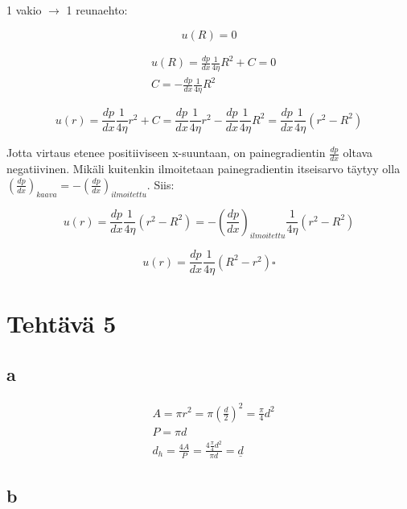\documentclass[12pt,a4paper,finnish]{article}
\begin{document}
1 vakio $\rightarrow$ 1 reunaehto:

\begin{equation}
 u(R) = 0
\end{equation}

\begin{align}
 &u(R) = \frac{dp}{dx}\frac{1}{4\eta}R^2 + C = 0\\
 &C = -\frac{dp}{dx}\frac{1}{4\eta}R^2
\end{align}

\begin{equation}
 u(r) = \frac{dp}{dx}\frac{1}{4\eta}r^2 + C = \frac{dp}{dx}\frac{1}{4\eta}r^2 - \frac{dp}{dx}\frac{1}{4\eta}R^2
  = \frac{dp}{dx}\frac{1}{4\eta}(r^2 - R^2)
\end{equation}

Jotta virtaus etenee positiiviseen x-suuntaan, on painegradientin $\frac{dp}{dx}$ oltava negatiivinen. Mikäli kuitenkin 
ilmoitetaan painegradientin itseisarvo täytyy olla $\left(\frac{dp}{dx}\right)_{kaava} = -\left(\frac{dp}{dx}\right)_{ilmoitettu}$. Siis:

\begin{equation}
 u(r) = \frac{dp}{dx}\frac{1}{4\eta}(r^2 - R^2) = -\left(\frac{dp}{dx}\right)_{ilmoitettu}\frac{1}{4\eta}(r^2 - R^2)
\end{equation}

\begin{framed}
 \begin{equation}
  u(r) = \frac{dp}{dx}\frac{1}{4\eta}(R^2 - r^2) \square
 \end{equation}
\end{framed}

\section{Tehtävä 5}

\subsection{a}

\begin{align}
 &A = \pi r^2 = \pi \left(\frac{d}{2}\right)^2 = \frac{\pi}{4}d^2\\
 &P = \pi d\\
 &d_h = \frac{4A}{P} = \frac{4\frac{\pi}{4}d^2}{\pi d} = \underline{d}
\end{align}

\subsection{b}
\end{document}

